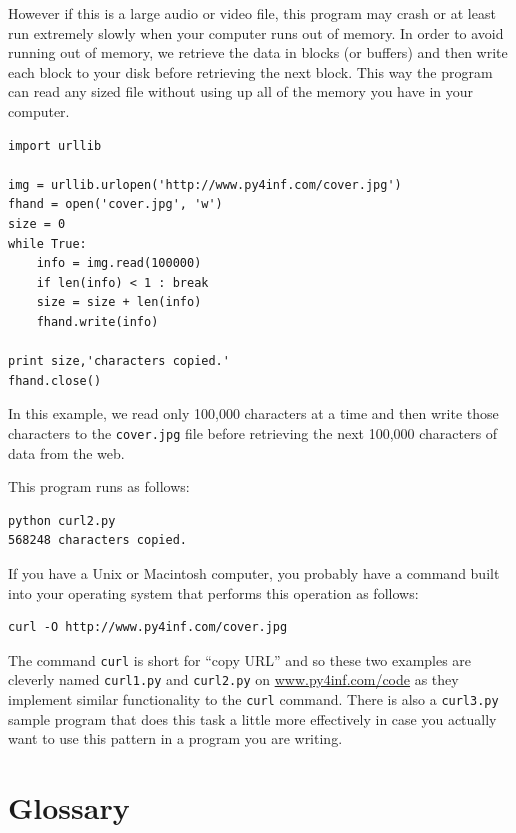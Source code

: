 \documentclass[11pt]{book}
\begin{document}
However if this is a large audio or video file, this program may crash
or at least run extremely slowly when your computer runs out of memory.
In order to avoid running out of memory, we retrieve the data in blocks
(or buffers) and then write each block to your disk before retrieving
the next block.  This way the program can read any sized file without
using up all of the memory you have in your computer.

\beforeverb
\begin{verbatim}
import urllib

img = urllib.urlopen('http://www.py4inf.com/cover.jpg')
fhand = open('cover.jpg', 'w')
size = 0
while True:
    info = img.read(100000)
    if len(info) < 1 : break
    size = size + len(info)
    fhand.write(info)

print size,'characters copied.'
fhand.close()
\end{verbatim}
\afterverb
%
In this example, we read only 100,000 characters at a time and then 
write those characters to the {\tt cover.jpg} file
before retrieving the next 100,000 characters of data from the
web.

This program runs as follows:

\beforeverb
\begin{verbatim}
python curl2.py 
568248 characters copied.
\end{verbatim}
\afterverb
%

If you have a Unix or Macintosh computer, you probably have a command
built into your operating system that performs this operation
as follows:

\beforeverb
\begin{verbatim}
curl -O http://www.py4inf.com/cover.jpg
\end{verbatim}
\afterverb
%
The command {\tt curl} is short for ``copy URL'' and so these two 
examples are cleverly named {\tt curl1.py} and {\tt curl2.py} on 
\url{www.py4inf.com/code} as they implement similar functionality
to the {\tt curl} command.  There is also a {\tt curl3.py} sample 
program that does this task a little more effectively in case you
actually want to use this pattern in a program you are writing.

\section{Glossary}
\end{document}

